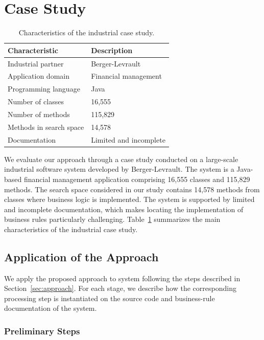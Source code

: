 \section{Case Study}
\label{sec:caseStudy}

\begin{table}[H]
\centering
\caption{Characteristics of the industrial case study.}
\label{tab:case-study}
\begin{tabular}{ll}
\toprule
\textbf{Characteristic} & \textbf{Description} \\
\midrule
Industrial partner & Berger-Levrault \\
Application domain & Financial management \\
Programming language & Java \\
Number of classes & 16,555 \\
Number of methods & 115,829 \\
Methods in search space & 14,578 \\
Documentation & Limited and incomplete \\
\bottomrule
\end{tabular}
\end{table}

We evaluate our approach through a case study conducted on a large-scale industrial software system developed by Berger-Levrault. The system is a Java-based financial management application comprising 16,555 classes and 115,829 methods. The search space considered in our study contains 14,578 methods from classes where business logic is implemented. The system is supported by limited and incomplete documentation, which makes locating the implementation of business rules particularly challenging. Table~\ref{tab:case-study} summarizes the main characteristics of the industrial case study.

\subsection{Application of the Approach}

We apply the proposed approach to system following the steps described in Section~\ref{sec:approach}. For each stage, we describe how the corresponding processing step is instantiated on the source code and business-rule documentation of the system.

\subsubsection{Preliminary Steps}\noindent

